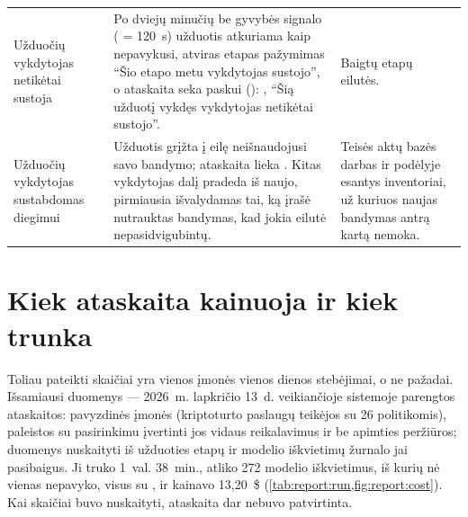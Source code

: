 \begin{xltabular}{\textwidth}{@{}L{34mm}YL{40mm}@{}}
Užduočių vykdytojas netikėtai sustoja & Po dviejų minučių be gyvybės signalo ( = 120~s) užduotis atkuriama kaip nepavykusi, atviras etapas pažymimas \enquote{Šio etapo metu vykdytojas sustojo}, o ataskaita seka paskui (): , \enquote{Šią užduotį vykdęs vykdytojas netikėtai sustojo}. & Baigtų etapų eilutės. \\
Užduočių vykdytojas sustabdomas diegimui & Užduotis grįžta į eilę neišnaudojusi savo bandymo; ataskaita lieka . Kitas vykdytojas dalį pradeda iš naujo, pirmiausia išvalydamas tai, ką įrašė nutrauktas bandymas, kad jokia eilutė nepasidvigubintų. & Teisės aktų bazės darbas ir podėlyje esantys inventoriai, už kuriuos naujas bandymas antrą kartą nemoka. \\
\end{xltabular}


\section{Kiek ataskaita kainuoja ir kiek trunka}\label{sec:report:cost}

Toliau pateikti skaičiai yra vienos įmonės vienos dienos stebėjimai, o ne pažadai. Išsamiausi
duomenys --- 2026~m. lapkričio 13~d. veikiančioje sistemoje parengtos ataskaitos: pavyzdinės
įmonės \demo{} (kriptoturto paslaugų teikėjos su 26 politikomis), paleistos su pasirinkimu
įvertinti jos vidaus reikalavimus ir be apimties peržiūros; duomenys nuskaityti iš užduoties
etapų ir modelio iškvietimų žurnalo jai pasibaigus. Ji truko 1~val. 38~min., atliko 272 modelio
iškvietimus, iš kurių nė vienas nepavyko, visus su , ir kainavo 13,20~\$
(\cref{tab:report:run,fig:report:cost}). Kai skaičiai buvo nuskaityti, ataskaita dar nebuvo
patvirtinta.

